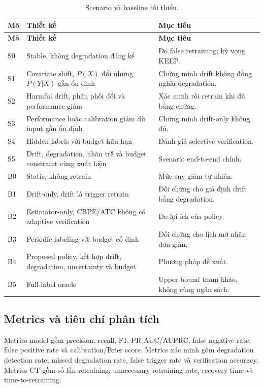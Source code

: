 \begin{longtable}{@{}L{1.3cm} L{7.5cm} L{\dimexpr\linewidth-8.8cm-4\tabcolsep\relax}@{}}
\caption{Scenario và baseline tối thiểu.}\label{tab:summary-scenarios}\\
\toprule\textbf{Mã} & \textbf{Thiết kế} & \textbf{Mục tiêu}\\
\midrule\endfirsthead
\toprule\textbf{Mã} & \textbf{Thiết kế} & \textbf{Mục tiêu}\\
\midrule\endhead
S0 & Stable, không degradation đáng kể & Đo false retraining; kỳ vọng KEEP.\\
S1 & Covariate shift, \(P(X)\) đổi nhưng \(P(Y|X)\) gần ổn định & Chứng minh drift không đồng nghĩa degradation.\\
S2 & Harmful drift, phân phối đổi và performance giảm & Xác minh rồi retrain khi đủ bằng chứng.\\
S3 & Performance hoặc calibration giảm dù input gần ổn định & Chứng minh drift-only không đủ.\\
S4 & Hidden labels với budget hữu hạn & Đánh giá selective verification.\\
S5 & Drift, degradation, nhãn trễ và budget constraint cùng xuất hiện & Scenario end-to-end chính.\\
\midrule
B0 & Static, không retrain & Mức suy giảm tự nhiên.\\
B1 & Drift-only, drift là trigger retrain & Đối chứng cho giả định drift bằng degradation.\\
B2 & Estimator-only, CBPE/ATC không có adaptive verification & Đo lợi ích của policy.\\
B3 & Periodic labeling với budget cố định & Đối chứng cho lịch mở nhãn đơn giản.\\
B4 & Proposed policy, kết hợp drift, degradation, uncertainty và budget & Phương pháp đề xuất.\\
B5 & Full-label oracle & Upper bound tham khảo, không cùng ngân sách.\\
\bottomrule
\end{longtable}

\subsection{Metrics và tiêu chí phân tích}

Metrics model gồm precision, recall, F1, PR-AUC/AUPRC, false negative rate, false positive rate và calibration/Brier score. Metrics xác minh gồm degradation detection rate, missed degradation rate, false trigger rate và verification accuracy. Metrics CT gồm số lần retraining, unnecessary retraining rate, recovery time và time-to-retraining.

